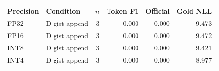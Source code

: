 \begin{tabular}{llrrrr}
\toprule
Precision & Condition & $n$ & Token F1 & Official & Gold NLL \\
\midrule
FP32 & D gist append & 3 & 0.000 & 0.000 & 9.473 \\
FP16 & D gist append & 3 & 0.000 & 0.000 & 9.472 \\
INT8 & D gist append & 3 & 0.000 & 0.000 & 9.421 \\
INT4 & D gist append & 3 & 0.000 & 0.000 & 8.977 \\
\bottomrule
\end{tabular}
